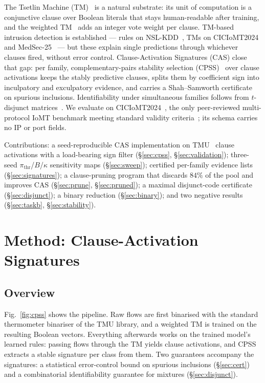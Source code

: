 \documentclass[conference]{IEEEtran}
\begin{document}
The Tsetlin Machine (TM)~\cite{granmo2018} is a natural substrate: its
unit of computation is a conjunctive clause over Boolean literals that
stays human-readable after training, and the weighted
TM~\cite{phoulady2020} adds an integer vote weight per clause. TM-based
intrusion detection is established --- rules on
NSL-KDD~\cite{abeyrathna2020}, TMs on CICIoMT2024 and
MedSec-25~\cite{jaiswal2026iomt,jaiswal2026medsec} --- but these explain single
predictions through whichever clauses fired, without error control. Clause-Activation Signatures (CAS) close that gap: per family,
complementary-pairs stability selection
(CPSS)~\cite{meinshausen2010,shah2013} over clause activations keeps the
stably predictive clauses, splits them by coefficient sign into
inculpatory and exculpatory evidence, and carries a Shah--Samworth
certificate on spurious inclusions. Identifiability under simultaneous families follows from
$t$-disjunct matrices~\cite{du1993}. We evaluate on
CICIoMT2024~\cite{dadkhah2024}, the only peer-reviewed multi-protocol IoMT
benchmark meeting standard validity
criteria~\cite{sommer2010,engelen2021,arp2022}; its schema carries no IP or
port fields.

Contributions: a seed-reproducible CAS implementation on TMU~\cite{tmu}
clause activations with a load-bearing sign filter
(\S\ref{sec:cpss}, \S\ref{sec:validation}); three-seed
$\pi_{\mathrm{thr}}$/$B$/$\kappa$ sensitivity maps (\S\ref{sec:sweep});
certified per-family evidence
lists (\S\ref{sec:signatures}); a clause-pruning program that discards
$84\%$ of the pool and improves CAS (\S\ref{sec:prune},
\S\ref{sec:pruned}); a maximal disjunct-code certificate
(\S\ref{sec:disjunct}); a binary reduction (\S\ref{sec:binary}); and two
negative results (\S\ref{sec:taskb}, \S\ref{sec:stability}).

\section{Method: Clause-Activation Signatures}
\subsection{Overview}
Fig.~\ref{fig:cpss} shows the pipeline. Raw flows are first binarised with
the standard thermometer binariser of the TMU library, and a weighted TM
is trained on the resulting Boolean vectors. Everything afterwards works
on the trained model's learned rules: passing flows through the TM yields
clause activations, and CPSS extracts a stable signature per class from
them. Two guarantees accompany the signatures: a statistical
error-control bound on spurious inclusions (\S\ref{sec:cert}) and a
combinatorial identifiability guarantee for mixtures
(\S\ref{sec:disjunct}).
\end{document}
